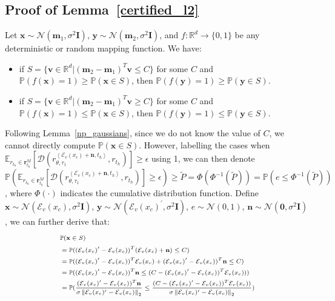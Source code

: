 \subsection{Proof of Lemma~\ref{certified_l2}}
\label{proof-lemma-1}
\begin{lemma}
\label{np_gaussians}
Let $\mathbf{x}\sim\mathcal{N}(\mathbf{m}_1, \sigma^2\mathbf{I})$, $\mathbf{y}\sim\mathcal{N}(\mathbf{m}_2, \sigma^2\mathbf{I})$, and $f:\mathbb{R}^d\rightarrow\{0, 1\}$ be any deterministic or random mapping function. We have:
\begin{itemize}
\item if $S = \{\mathbf{v}\in\mathbb{R}^d | (\mathbf{m}_2 - \mathbf{m}_1)^T\mathbf{v}\leq C\}$ for some $C$ and $\mathbb{P}(f(\mathbf{x})=1)\geq\mathbb{P}(\mathbf{x}\in S)$, then $\mathbb{P}(f(\mathbf{y})=1)\geq\mathbb{P}(\mathbf{y}\in S)$. 
\item if $S = \{\mathbf{v}\in\mathbb{R}^d | (\mathbf{m}_2 - \mathbf{m}_1)^T\mathbf{v}\geq C\}$ for some $C$ and $\mathbb{P}(f(\mathbf{x})=1)\leq\mathbb{P}(\mathbf{x}\in S)$, then $\mathbb{P}(f(\mathbf{y})=1)\leq\mathbb{P}(\mathbf{y}\in S)$.
\end{itemize}
\end{lemma}
Following Lemma~\ref{np_gaussians}, since we do not know the value of $C$, we cannot directly compute $\mathbb{P}(\mathbf{x}\in S)$. However, labelling the cases when $\mathbb{E}_{r_{t_h}\in\mathbf{r}_{t_h}^M}[\mathcal{D}(r_{\theta, \tau_1}^{\left<\mathcal{E}_v(x_c)+\mathbf{n}, t_h\right>}, r_{t_h})]\geq\epsilon$ using 1, we can then denote $\mathbb{P}(\mathbb{E}_{r_{t_h}\in\mathbf{r}_{t_h}^M}[\mathcal{D}(r_{\theta, \tau_1}^{\left<\mathcal{E}_v(x_c)+\mathbf{n}, t_h\right>}, r_{t_h})]\geq\epsilon)\geq\tilde{P}= \Phi(\Phi^{-1}(\tilde{P}))= \mathbb{P}(e\leq\Phi^{-1}(\tilde{P}))$, where $\Phi(\cdot)$ indicates the cumulative distribution function. Define $\mathbf{x}\sim\mathcal{N}(\mathcal{E}_v(x_c), \sigma^2\mathbf{I})$, $\mathbf{y}\sim\mathcal{N}(\mathcal{E}_v(x_c)^{\prime}, \sigma^2\mathbf{I})$, $e\sim\mathcal{N}(0, 1)$, $\mathbf{n}\sim\mathcal{N}(\mathbf{0}, \sigma^2\mathbf{I})$, we can further derive that:
\begin{align}
\scriptsize
\begin{split}
&\mathbb{P}(\mathbf{x}\in S)\\
&= \mathbb{P}((\mathcal{E}_v(x_c)^{\prime} - \mathcal{E}_v(x_c))^T(\mathcal{E}_v(x_c)+\mathbf{n})\leq C) \\
&=\mathbb{P}((\mathcal{E}_v(x_c)^{\prime} - \mathcal{E}_v(x_c))^T\mathcal{E}_v(x_c)+(\mathcal{E}_v(x_c)^{\prime} - \mathcal{E}_v(x_c))^T\mathbf{n}\leq C)\\
&=\mathbb{P}((\mathcal{E}_v(x_c)^{\prime} - \mathcal{E}_v(x_c))^T\mathbf{n}\leq (C - (\mathcal{E}_v(x_c)^{\prime} - \mathcal{E}_v(x_c))^T\mathcal{E}_v(x_c)))\\
&=\mathbb{P}(\frac{(\mathcal{E}_v(x_c)^{\prime} - \mathcal{E}_v(x_c))^T\mathbf{n}}{\sigma\left\|\mathcal{E}_v(x_c)^{\prime} - \mathcal{E}_v(x_c)\right\|_2}\leq \frac{(C - (\mathcal{E}_v(x_c)^{\prime} - \mathcal{E}_v(x_c))^T\mathcal{E}_v(x_c))}{\sigma\left\|\mathcal{E}_v(x_c)^{\prime} - \mathcal{E}_v(x_c)\right\|_2})
\end{split}
\end{align}
